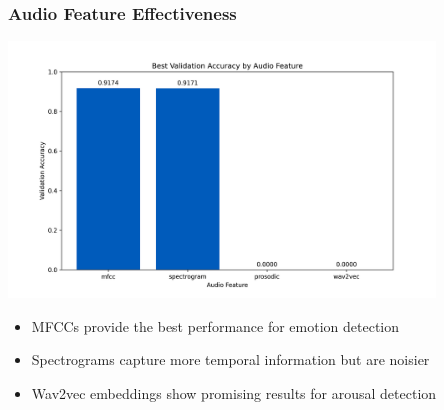 \begin{frame}
\frametitle{Audio Feature Effectiveness}
\begin{center}
\includegraphics[width=0.85\textwidth]{figures/audio_feature_comparison.png}
\end{center}

\begin{itemize}
    \item MFCCs provide the best performance for emotion detection
    \item Spectrograms capture more temporal information but are noisier
    \item Wav2vec embeddings show promising results for arousal detection
\end{itemize}
\end{frame}

